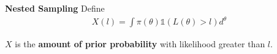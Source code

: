 \begin{frame}{\small{\textbf{Nested Sampling}}}
Define
\begin{align*}
	X(l) = \int \pi(\theta) \mathds{1}\left(L(\theta) > l\right)d^\theta
\end{align*}

$X$ is the {\bf amount of prior probability} with likelihood greater than $l$.
\end{frame}
